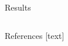 \documentclass[final,hyperref={pdfpagelabels=true}]{beamer}
\begin{document}
\begin{frame}
\begin{center}
\begin{minipage}{\textwidth}
\begin{block}{Results}
\begin{columns}[t]
			\end{columns}
		\end{block}
	\end{minipage}
	\begin{minipage}{\textwidth}
		\begin{block}{References}
%			
%       		
			\small
			[text]
			\begin{multicols}{2}
			\centering
			
			
			\end{multicols}
		\end{block}
	\end{minipage}
	\end{center}
    
%      
%
%      
%
%
%      
%      
%      

\end{frame}
\end{document}
